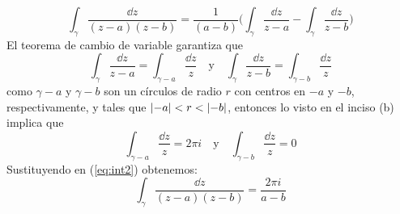 \begin{sol}
\begin{enumerate}[label=(\alph*), leftmargin=1.8em]
\begin{equation}\label{eq:int2}
\int_\gamma \frac{\dd{z}}{(z-a)(z-b)} 
= \frac{1}{(a-b)}\biggl(\int_\gamma\frac{\dd{z}}{z-a} - \int_\gamma\frac{\dd{z}}{z-b}\biggr)
\end{equation}
El teorema de cambio de variable garantiza que
\[
\int_\gamma\frac{\dd{z}}{z-a}
=\int_{\gamma-a} \frac{\dd{z}}{z}
\quad\text{y}\quad
\int_\gamma\frac{\dd{z}}{z-b}
=\int_{\gamma-b} \frac{\dd{z}}{z}
\]
como $\gamma -a$ y $\gamma-b$ son un círculos de radio $r$ con centros en $-a$ y $-b$, respectivamente, y tales que $\abs{-a} < r < \abs{-b}$, entonces lo visto en el inciso (b) implica que 
\[
\int_{\gamma-a} \frac{\dd{z}}{z} = 2\pi i
\quad\text{y}\quad
\int_{\gamma-b} \frac{\dd{z}}{z} = 0
\]
Sustituyendo en (\ref{eq:int2}) obtenemos:
\[
\int_\gamma \frac{\dd{z}}{(z-a)(z-b)} 
= \frac{2\pi i}{a-b}
\]
\end{enumerate}
\end{sol}